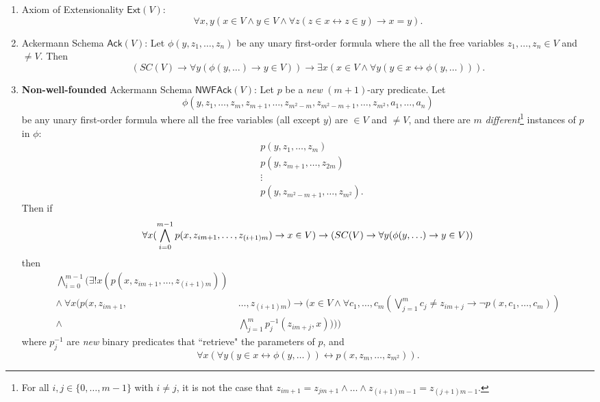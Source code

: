 \documentclass{article}
\begin{document}
\begin{enumerate}
	\item Axiom of Extensionality $\textsf{Ext}(V)$: $$\forall x, y (x \in V \wedge y \in V \wedge \forall z(z\in x \leftrightarrow z \in y) \rightarrow x = y).$$
	\item Ackermann Schema $\textsf{Ack}(V)$: Let $\phi(y, z_1, \ldots, z_n)$ be any unary first-order formula where the all the free variables $z_1, \ldots, z_n \in V$ and $\ne V$. Then $$(SC(V) \rightarrow \forall y(\phi(y, \ldots) \rightarrow y \in V)) \rightarrow \exists x(x \in V \wedge \forall y(y \in x \leftrightarrow \phi(y, \ldots))).$$
    \item \textbf{Non-well-founded} Ackermann Schema $\textsf{NWFAck}(V)$: Let $p$ be a \textit{new} $(m+1)$-ary predicate. Let $$\phi(y, z_1, \ldots, z_m, z_{m+1}, \ldots, z_{m^2-m}, z_{m^2-m+1}, \ldots, z_{m^2}, a_1, \ldots, a_n)$$ be any unary first-order formula where all the free variables (all except $y$) are $\in V$ and $\ne V$, and there are $m$ \textit{different}\footnote{For all $i,j \in \{0, \ldots, m-1\}$ with $i \ne j$, it is not the case that $z_{im+1} = z_{jm+1} \wedge \ldots \wedge z_{(i+1)m-1} = z_{(j+1)m-1}$.} instances of $p$ in $\phi$:
\begin{align*}
&p(y, z_1, \ldots, z_m) \\ &p(y, z_{m+1}, \ldots, z_{2m}) \\ &\vdots \\ &p(y, z_{m^2-m+1}, \ldots, z_{m^2}).
\end{align*}
Then if
$$\forall x(\bigwedge_{i=0}^{m-1}{p(x, z_{im+1}, \ldots, z_{(i+1)m})}\rightarrow x \in V) \rightarrow \\ (SC(V) \rightarrow \forall y(\phi(y, \ldots) \rightarrow y \in V))$$
then
\begin{align*}
\bigwedge_{i=0}^{m-1}\Big(\exists!x(p(x, z_{im+1}, \ldots, z_{(i+1)m}))\ &  \\ \wedge\ \forall x(p(x, z_{im+1}, & \ldots, z_{(i+1)m}) \rightarrow (x \in V \wedge \forall c_1, \ldots, c_m (\bigvee_{j=1}^m {c_j \ne z_{im+j}} \rightarrow \neg p(x, c_1, \ldots, c_m)) \\ \wedge & \bigwedge_{j=1}^{m} p_j^{-1}(z_{im+j}, x)))\Big)
\end{align*}
where $p_j^{-1}$ are \textit{new} binary predicates that ``retrieve" the parameters of $p$,
and
$$\forall x (\forall y (y \in x \leftrightarrow \phi(y, \ldots)) \leftrightarrow p(x, z_m, \ldots, z_{m^2})).$$
\end{enumerate}
\end{document}
